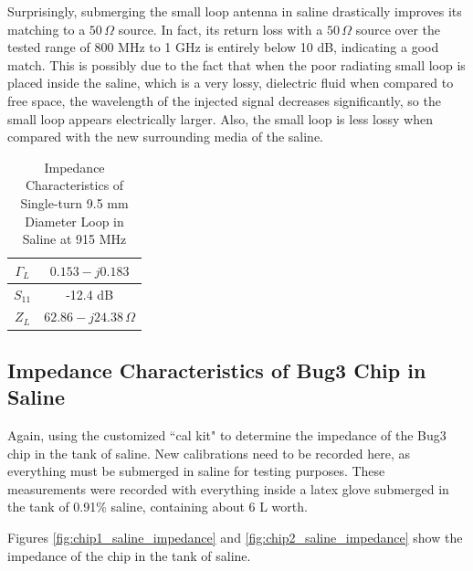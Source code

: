 \documentclass[12pt,onecolumn,titlepage]{article}
\begin{document}
Surprisingly, submerging the small loop antenna in saline drastically improves its matching to a $50 \, \Omega$ source. In fact, its return loss with a $50 \, \Omega$ source over the tested range of 800 MHz to 1 GHz is entirely below 10 dB, indicating a good match. This is possibly due to the fact that when the poor radiating small loop is placed inside the saline, which is a very lossy, dielectric fluid when compared to free space, the wavelength of the injected signal decreases significantly, so the small loop appears electrically larger. Also, the small loop is less lossy when compared with the new surrounding media of the saline.

\begin{table}[h]
\centering
	\caption{Impedance Characteristics of Single-turn 9.5 mm Diameter Loop in Saline at 915 MHz}
	\begin{tabular}{| c || c |}
	\hline
	$\Gamma_L$ & $0.153-j0.183$ \\ \hline
	$S_{11}$ & -12.4 dB \\ \hline
	$Z_L$ & $62.86-j24.38 \, \Omega$ \\ \hline
	\end{tabular}
\label{tab:sngl_loop_saline}
\end{table}

\subsection{Impedance Characteristics of Bug3 Chip in Saline}
\indent \indent Again, using the customized ``cal kit" to determine the impedance of the Bug3 chip in the tank of saline. New calibrations need to be recorded here, as everything must be submerged in saline for testing purposes. These measurements were recorded with everything inside a latex glove submerged in the tank of 0.91\% saline, containing about 6 L worth.

Figures \ref{fig:chip1_saline_impedance} and \ref{fig:chip2_saline_impedance} show the impedance of the chip in the tank of saline. 
\end{document}
